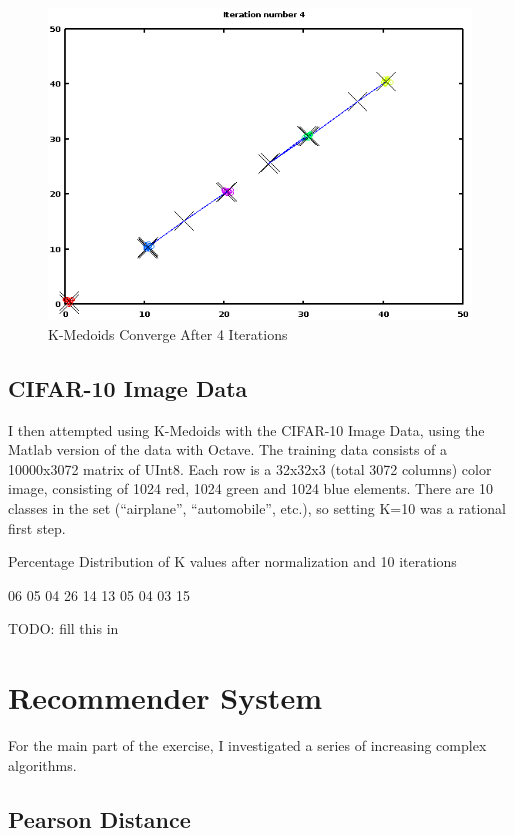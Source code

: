 \documentclass[11pt, oneside]{article}   	%
\begin{document}
\begin{figure}[h!]
\centering
\includegraphics[scale=0.6]{K-Medoid}
\caption{K-Medoids Converge After 4 Iterations}
\end{figure}

\subsection*{CIFAR-10 Image Data}

I then attempted using K-Medoids with the CIFAR-10 Image Data, using the Matlab version of the data with Octave. The training data consists of a 10000x3072 matrix of UInt8. Each row is a 32x32x3 (total 3072 columns) color image, consisting of 1024 red, 1024 green and 1024 blue elements. There are 10 classes in the set (``airplane'', ``automobile'', etc.), so setting K=10 was a rational first step.

Percentage Distribution of K values after normalization and 10 iterations

06
05
04
26
14
13
05
04
03
15

TODO: fill this in
	
\section*{Recommender System}

For the main part of the exercise, I investigated a series of increasing complex algorithms. 

\subsection*{Pearson Distance}
\end{document}
